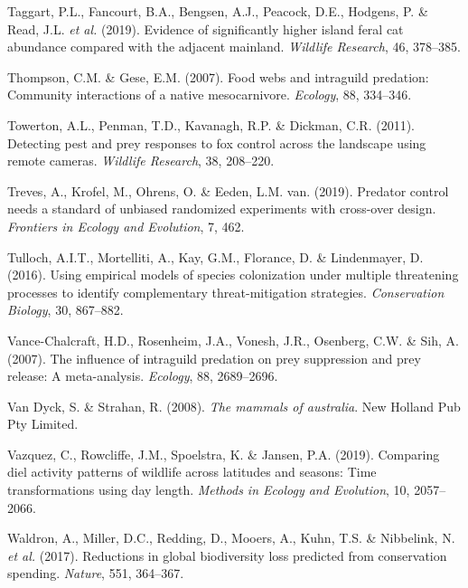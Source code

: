 \documentclass[11pt,a4paper,titlepage,twoside,openright]{style/unimelbthesis}
\begin{document}
\begin{mainmatter}
\leavevmode\hypertarget{ref-taggart2019evidence}{}%
Taggart, P.L., Fancourt, B.A., Bengsen, A.J., Peacock, D.E., Hodgens, P. \& Read, J.L. \emph{et al.} (2019). Evidence of significantly higher island feral cat abundance compared with the adjacent mainland. \emph{Wildlife Research}, 46, 378--385.

\leavevmode\hypertarget{ref-thompson2007food}{}%
Thompson, C.M. \& Gese, E.M. (2007). Food webs and intraguild predation: Community interactions of a native mesocarnivore. \emph{Ecology}, 88, 334--346.

\leavevmode\hypertarget{ref-towerton2011detecting}{}%
Towerton, A.L., Penman, T.D., Kavanagh, R.P. \& Dickman, C.R. (2011). Detecting pest and prey responses to fox control across the landscape using remote cameras. \emph{Wildlife Research}, 38, 208--220.

\leavevmode\hypertarget{ref-treves2019predator}{}%
Treves, A., Krofel, M., Ohrens, O. \& Eeden, L.M. van. (2019). Predator control needs a standard of unbiased randomized experiments with cross-over design. \emph{Frontiers in Ecology and Evolution}, 7, 462.

\leavevmode\hypertarget{ref-tulloch2016using}{}%
Tulloch, A.I.T., Mortelliti, A., Kay, G.M., Florance, D. \& Lindenmayer, D. (2016). Using empirical models of species colonization under multiple threatening processes to identify complementary threat-mitigation strategies. \emph{Conservation Biology}, 30, 867--882.

\leavevmode\hypertarget{ref-vance2007influence}{}%
Vance-Chalcraft, H.D., Rosenheim, J.A., Vonesh, J.R., Osenberg, C.W. \& Sih, A. (2007). The influence of intraguild predation on prey suppression and prey release: A meta-analysis. \emph{Ecology}, 88, 2689--2696.

\leavevmode\hypertarget{ref-van2008mammals}{}%
Van Dyck, S. \& Strahan, R. (2008). \emph{The mammals of australia}. New Holland Pub Pty Limited.

\leavevmode\hypertarget{ref-vazquez2019comparing}{}%
Vazquez, C., Rowcliffe, J.M., Spoelstra, K. \& Jansen, P.A. (2019). Comparing diel activity patterns of wildlife across latitudes and seasons: Time transformations using day length. \emph{Methods in Ecology and Evolution}, 10, 2057--2066.

\leavevmode\hypertarget{ref-waldron2017reductions}{}%
Waldron, A., Miller, D.C., Redding, D., Mooers, A., Kuhn, T.S. \& Nibbelink, N. \emph{et al.} (2017). Reductions in global biodiversity loss predicted from conservation spending. \emph{Nature}, 551, 364--367.


\end{mainmatter}
\end{document}
